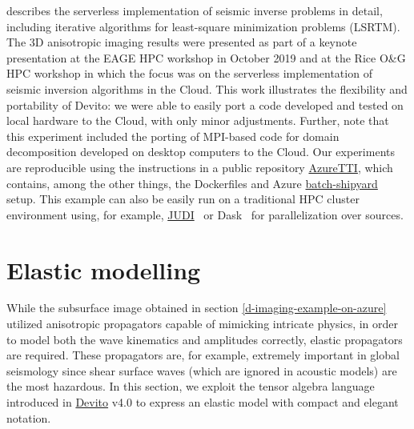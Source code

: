 \documentclass[conference]{IEEEtran}
\begin{document}
\cite{witte2019TPDedas} describes the serverless implementation of seismic
inverse problems in detail, including iterative algorithms for least-square
minimization problems (LSRTM). The 3D anisotropic imaging results were presented
as part of a keynote presentation at the EAGE HPC workshop in October 2019
\cite{herrmann2019EAGEHPCaii} and at the Rice O\&G HPC workshop
\cite{witte2019RHPCssi} in which the focus was on the serverless implementation
of seismic inversion algorithms in the Cloud. This work illustrates the
flexibility and portability of Devito: we were able to easily port a code
developed and tested on local hardware to the Cloud, with only minor
adjustments. Further, note that this experiment included the porting of
MPI-based code for domain decomposition developed on desktop computers to the
Cloud. Our experiments are reproducible using the instructions in a public
repository \href{https://github.com/slimgroup/Azure2019}{AzureTTI}, which
contains, among the other things, the Dockerfiles and Azure
\href{https://batch-shipyard.readthedocs.io}{batch-shipyard} setup. This example
can also be easily run on a traditional HPC cluster environment using, for example, 
\href{https://github.com/slimgroup/JUDI.jl}{JUDI}~\cite{witte2018alf} or Dask~\cite{dask}
for parallelization over sources.

\section{Elastic modelling}\label{elastic-modelling}

While the subsurface image obtained in section \ref{d-imaging-example-on-azure}
utilized anisotropic propagators capable of mimicking intricate physics, in order
to model both the wave kinematics and amplitudes correctly, elastic
propagators are required. These propagators are, for example, extremely
important in global seismology since shear surface waves (which are
ignored in acoustic models) are the most hazardous. In this section, we
exploit the tensor algebra language introduced in \href{https://github.com/devitocodes/devito}{Devito} v4.0 to express
an elastic model with compact and elegant notation.
\end{document}
